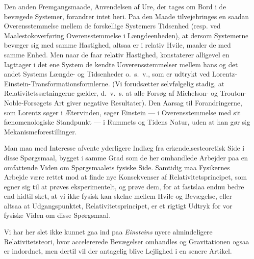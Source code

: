 \documentclass[12pt,a4paper]{article}
\begin{document}
Den anden Fremgangsmaade, Anvendelsen af Ure, der tages om Bord i de
bevægede Systemer, forandrer intet heri. Paa den Maade tilvejebringes
en saadan Overensstemmelse mellem de forskellige Systemers Tidsenhed
(resp. ved Maalestokoverføring Overensstemmelse i Længdeenheden), at
dersom Systemerne bevæger sig med samme Hastighed, altsaa er i relativ
Hvile, maaler de med samme Enhed. Men naar de faar relativ Hastighed,
konstaterer alligevel en Iagttager i det ene System de kendte
Uoverensstemmelser mellem hans og det andet Systems Længde- og
Tidsenheder o.~s.~v., som er udtrykt ved
Lorentz-Einstein-Transformationsformlerne. (Vi forudsætter selvfølgelig
stadig, at Relativitetssætningerne gælder, d.~v.~s. at alle Forsøg af
Michelson- og Trouton-Noble-Forsøgets Art giver negative Resultater).
Den Aarsag til Forandringerne, som Lorentz søger i Ætervinden, søger
Einstein --- i Overensstemmelse med sit fænomenologiske Standpunkt ---
i Rummets og Tidens Natur, uden at han gør sig
Mekanismeforestillinger.

\medskip

Man maa med Interesse afvente yderligere Indlæg fra erkendelsesteoretisk
Side i disse Spørgsmaal, bygget i samme Grad som de her omhandlede
Arbejder paa en omfattende Viden om Spørgsmaalets fysiske Side.
Samtidig maa Fysikernes Arbejde være rettet mod at finde nye
Konsekvenser af Relativitetsprincipet, som egner sig til at prøves
eksperimentelt, og prøve dem, for at fastslaa endnu bedre end hidtil
sket, at vi ikke fysisk kan skelne mellem Hvile og Bevægelse, eller
altsaa at Udgangspunktet, Relativitetsprincipet, er et rigtigt Udtryk
for vor fysiske Viden om disse Spørgsmaal.

Vi har her slet ikke kunnet gaa ind paa \emph{Einsteins} nyere
almindeligere Relativitetsteori, hvor accelererede Bevægelser
omhandles og Gravitationen ogsaa er indordnet, men dertil vil der
antagelig blive Lejlighed i en senere Artikel.
\end{document}
